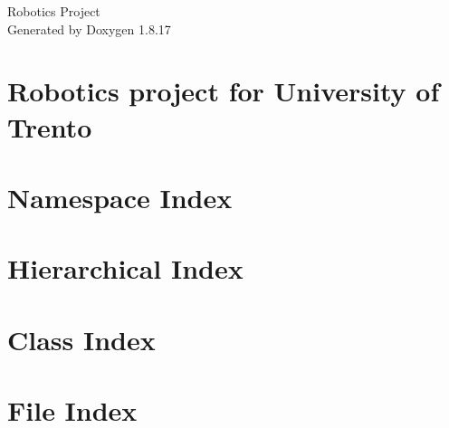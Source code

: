 \let\mypdfximage\pdfximage\def\pdfximage{\immediate\mypdfximage}\documentclass[twoside]{book}
\newcommand{\+}{\discretionary{\mbox{\scriptsize$\hookleftarrow$}}{}{}}
\newcommand{\clearemptydoublepage}{%
  \newpage{\pagestyle{empty}\cleardoublepage}%
}
\begin{document}
\hypersetup{pageanchor=false,
             bookmarksnumbered=true,
             pdfencoding=unicode
            }
\begin{titlepage}
\vspace*{7cm}
\begin{center}%
{\Large Robotics Project }\\
\vspace*{1cm}
{\large Generated by Doxygen 1.8.17}\\
\end{center}
\end{titlepage}
\clearemptydoublepage
{}
\tableofcontents
\clearemptydoublepage
{}
\hypersetup{pageanchor=true}

\chapter{Robotics project for University of Trento}
\label{md_README}

\chapter{Namespace Index}

\chapter{Hierarchical Index}

\chapter{Class Index}

\chapter{File Index}

\end{document}
